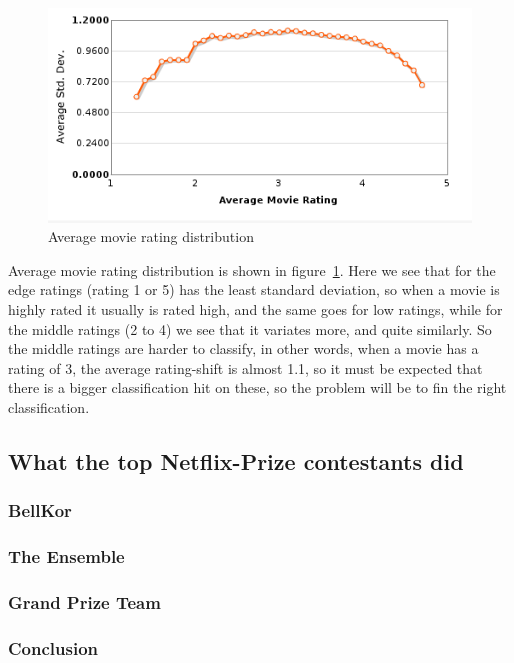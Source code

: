 \begin{figure}[H]
\includegraphics[width=5in]{image/avgmovierating.png}
\centering
\caption{Average movie rating distribution}
\label{figure:avgmovierating}
\end{figure}

Average movie rating distribution is shown in figure~\ref{figure:avgmovierating}. Here we see that for the edge ratings (rating 1 or 5) has the least standard deviation, so when a movie is highly rated it usually is rated high, and the same goes for low ratings, while for the middle ratings (2 to 4) we see that it variates more, and quite similarly. So the middle ratings are harder to classify, in other words, when a movie has a rating of 3, the average rating-shift is almost 1.1, so it must be expected that there is a bigger classification hit on these, so the problem will be to fin the right classification.



\subsection{What the top Netflix-Prize contestants did}

\subsubsection{BellKor}
\subsubsection{The Ensemble}
\subsubsection{Grand Prize Team}
\subsubsection{Conclusion}



